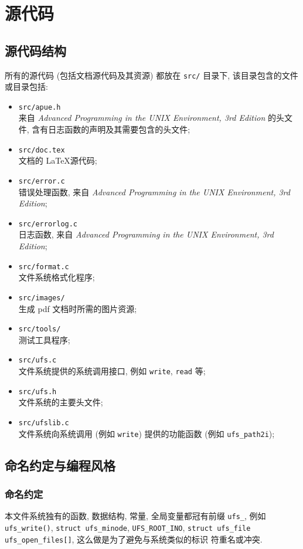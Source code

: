 \documentclass[nofonts, titlepage]{ctexart}
\begin{document}
\section{源代码}
\subsection{源代码结构}
所有的源代码 (包括文档源代码及其资源) 都放在 \verb'src/' 目录下,
该目录包含的文件或目录包括:
\begin{itemize}
    \item \verb'src/apue.h'     \\
        来自 \textit{Advanced Programming in the UNIX Environment, 3rd Edition}
        的头文件, 含有日志函数的声明及其需要包含的头文件;
    \item \verb'src/doc.tex' \\
        文档的 \LaTeX 源代码;
    \item \verb'src/error.c' \\
        错误处理函数, 来自 \textit{Advanced Programming in the UNIX
        Environment, 3rd Edition};
    \item \verb'src/errorlog.c' \\
        日志函数, 来自 \textit{Advanced Programming in the UNIX
        Environment, 3rd Edition};
    \item \verb'src/format.c' \\
        文件系统格式化程序;
    \item \verb'src/images/' \\
        生成 pdf 文档时所需的图片资源;
    \item \verb'src/tools/' \\
        测试工具程序;
    \item \verb'src/ufs.c' \\
        文件系统提供的系统调用接口, 例如 \verb'write', \verb'read' 等;
    \item \verb'src/ufs.h' \\
        文件系统的主要头文件;
    \item \verb'src/ufslib.c' \\
        文件系统向系统调用 (例如 \verb'write') 提供的功能函数 (例如 
        \verb'ufs_path2i');
\end{itemize}

\subsection{命名约定与编程风格}
\subsubsection{命名约定}
本文件系统独有的函数, 数据结构, 常量, 全局变量都冠有前缀 \verb'ufs_',
例如 \verb'ufs_write()', \verb'struct ufs_minode', \verb'UFS_ROOT_INO',
\verb'struct ufs_file ufs_open_files[]', 这么做是为了避免与系统类似的标识
符重名或冲突.
\end{document}
